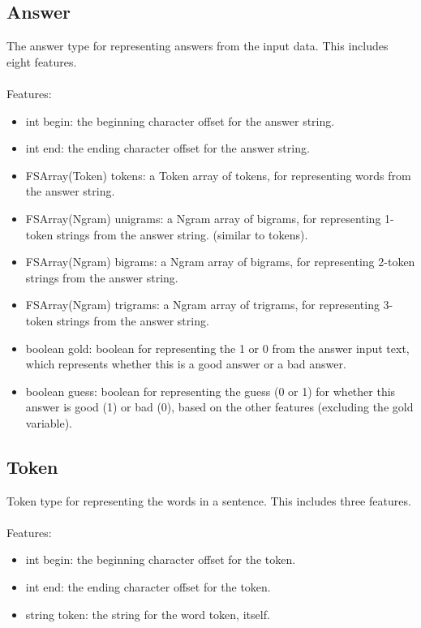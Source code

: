 \documentclass[11pt]{article}
\begin{document}
\subsection{Answer}
The answer type for representing answers from the input data. This includes eight features. \\ \\
Features:
\begin{itemize}
\item int begin: the beginning character offset for the answer string.
\item int end: the ending character offset for the answer string.
\item FSArray(Token) tokens: a Token array of tokens, for representing words from the answer string.
\item FSArray(Ngram) unigrams: a Ngram array of bigrams, for representing 1-token strings from the answer 
string. (similar to tokens).
\item FSArray(Ngram) bigrams: a Ngram array of bigrams, for representing 2-token strings from the answer 
string.
\item FSArray(Ngram) trigrams: a Ngram array of trigrams, for representing 3-token strings from the answer 
string.
\item boolean gold: boolean for representing the 1 or 0 from the answer input text, which represents whether 
this is a good answer or a bad answer.
\item boolean guess: boolean for representing the guess (0 or 1) for whether this answer is good (1) or bad 
(0), based on the other features (excluding the gold variable).
\end{itemize}

\subsection{Token}
Token type for representing the words in a sentence. This includes three features. \\ \\
Features:
\begin{itemize}
\item int begin: the beginning character offset for the token.
\item int end: the ending character offset for the token.
\item string token: the string for the word token, itself.
\end{itemize}
\end{document}
